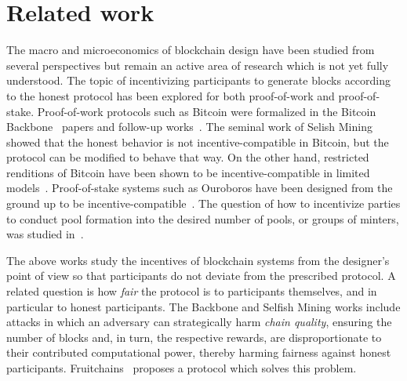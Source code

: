 \section{Related work}\label{sec:related}
The macro and microeconomics of blockchain design have
been studied from several perspectives but remain an active area of research
which is not yet fully understood. The topic of incentivizing participants to
generate blocks according to the honest protocol has been explored for both
proof-of-work and proof-of-stake. Proof-of-work protocols such as Bitcoin were
formalized in the Bitcoin Backbone~\cite{backbone1,backbone2} papers and
follow-up works~\cite{pass}. The seminal work of Selish Mining~\cite{selfish}
showed that the honest behavior is not incentive-compatible in Bitcoin, but the
protocol can be modified to behave that way. On the other hand, restricted
renditions of Bitcoin have been shown to be incentive-compatible in limited
models~\cite{tselekounis-kiayias}. Proof-of-stake systems such as Ouroboros
have been designed from the ground up to be
incentive-compatible~\cite{ouroboros}. The question of how to incentivize
parties to conduct pool formation into the desired number of pools, or groups of minters, was studied
in~\cite{stouka-koutsoupias-kiayias}.

The above works study the incentives of blockchain systems from the designer's
point of view so that participants do not deviate from the prescribed protocol.
A related question is how \emph{fair} the protocol is to participants
themselves, and in particular to honest participants. The Backbone and Selfish
Mining works include attacks in which an adversary can strategically harm
\emph{chain quality}, ensuring the number of blocks and, in turn, the respective
rewards, are disproportionate to their contributed computational power, thereby
harming fairness against honest participants. Fruitchains~\cite{fruitchains}
proposes a protocol which solves this problem.

